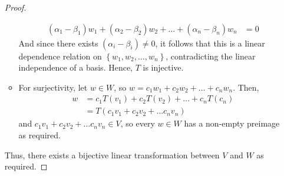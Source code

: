 \documentclass[letterpaper,12pt]{article}
\newcommand{\set}[1]{\left\{ #1 \right\}}
\theoremstyle{definition}
\begin{document}
\begin{enumerate}
\begin{mdframed}
\begin{proof}
\begin{itemize}
\begin{align*}
                      ({\alpha}_1 - {\beta}_1)w_1 + ({\alpha}_2 - {\beta}_2)w_2 + \ldots + ({\alpha}_n - {\beta}_n)w_n &= 0
                 \end{align*}
                 And since there exists $({\alpha}_i - {\beta}_i) \neq 0$, it follows that this is a linear dependence relation on $\set{w_1,w_2,\ldots,w_n}$, contradicting the linear independence of a basis. Hence, $T$ is injective.
                 \item For surjectivity, let $w \in W$, so $w = c_1w_1 + c_2 w_2 + \ldots + c_nw_n$. Then, \begin{align*}
                     w &= c_1T(v_1) + c_2T(v_2) + \ldots + c_nT(c_n) \\
                     &= T(c_1v_1 + c_2v_2 + \ldots c_nv_n)
                 \end{align*}
                 and $c_1v_1 + c_2v_2 + \ldots c_nv_n \in V$, so every $w \in W$ has a non-empty preimage as required.
             \end{itemize}
             Thus, there exists a bijective linear transformation between $V$ and $W$ as required. \end{proof}
         \end{mdframed}
\end{enumerate}
\pagebreak
\end{document}
